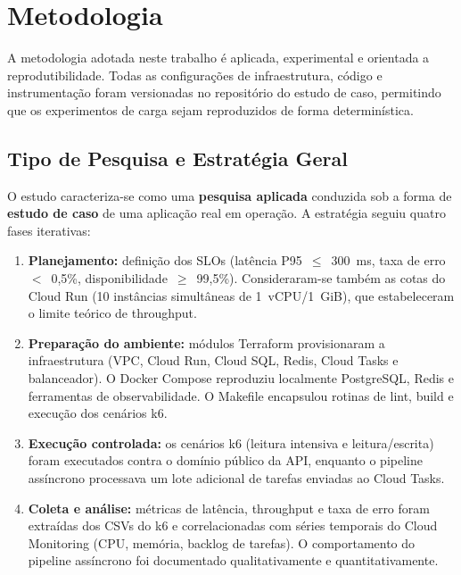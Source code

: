 \section{Metodologia}
\label{sec:metodologia}

A metodologia adotada neste trabalho é aplicada, experimental e orientada a reprodutibilidade.
Todas as configurações de infraestrutura, código e instrumentação foram versionadas
no repositório do estudo de caso, permitindo que os experimentos de carga sejam
reproduzidos de forma determinística.

\subsection{Tipo de Pesquisa e Estratégia Geral}

O estudo caracteriza-se como uma \textbf{pesquisa aplicada} conduzida sob a forma
de \textbf{estudo de caso} de uma aplicação real em operação. A estratégia seguiu
quatro fases iterativas:

\begin{enumerate}
    \item \textbf{Planejamento:} definição dos SLOs (latência P95~$\leq$~300~ms,
        taxa de erro~$<$~0,5\%, disponibilidade~$\geq$~99,5\%).
        Consideraram-se também as cotas do Cloud Run (10 instâncias simultâneas de 1~vCPU/1~GiB),
        que estabeleceram o limite teórico de throughput.

    \item \textbf{Preparação do ambiente:} módulos Terraform provisionaram a infraestrutura
        (VPC, Cloud Run, Cloud SQL, Redis, Cloud Tasks e balanceador).
        O Docker Compose reproduziu localmente PostgreSQL, Redis e ferramentas de observabilidade.
        O Makefile encapsulou rotinas de lint, build e execução dos cenários k6.

    \item \textbf{Execução controlada:} os cenários k6 (leitura intensiva e leitura/escrita)
        foram executados contra o domínio público da API, enquanto o pipeline assíncrono
        processava um lote adicional de tarefas enviadas ao Cloud Tasks.

    \item \textbf{Coleta e análise:} métricas de latência, throughput e taxa de erro foram
        extraídas dos CSVs do k6 e correlacionadas com séries temporais do Cloud Monitoring
        (CPU, memória, backlog de tarefas). O comportamento do pipeline assíncrono foi
        documentado qualitativamente e quantitativamente.
\end{enumerate}

